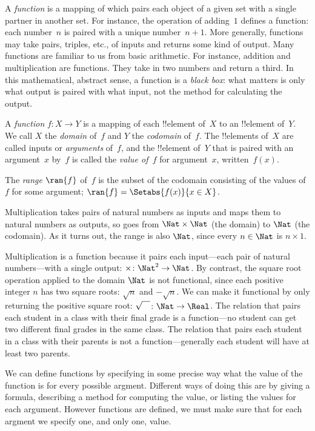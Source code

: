\documentclass[../../../include/open-logic-section]{subfiles}
\begin{document}

\begin{explain}
A \emph{function} is a mapping of which pairs each object of a given
set with a single partner in another set. For instance, the operation
of adding~$1$ defines a function: each number~$n$ is paired with a
unique number~$n+1$. More generally, functions may take pairs,
triples, etc., of inputs and returns some kind of output. Many
functions are familiar to us from basic arithmetic. For instance,
addition and multiplication are functions. They take in two numbers
and return a third.  In this mathematical, abstract sense, a function
is a \emph{black box}: what matters is only what output is paired with
what input, not the method for calculating the output.
\end{explain}

\begin{defn}[Function]
A \emph{function} $f \colon X \to Y$ is a mapping of each !!{element}
of~$X$ to an !!{element} of~$Y$. We call $X$ the \emph{domain} of~$f$
and $Y$ the \emph{codomain} of~$f$.  The !!{element}s of~$X$ are
called inputs or \emph{arguments} of~$f$, and the !!{element} of~$Y$
that is paired with an argument~$x$ by~$f$ is called the \emph{value
  of~$f$} for argument~$x$, written~$f(x)$.

The \emph{range} $\ran{f}$ of~$f$ is the subset of the codomain
consisting of the values of~$f$ for some argument; $\ran{f} =
\Setabs{f(x)}{x \in X}$.
\end{defn}

\begin{ex}
Multiplication takes pairs of natural numbers as inputs and maps them
to natural numbers as outputs, so goes from $\Nat \times \Nat$ (the
domain) to $\Nat$ (the codomain). As it turns out, the range is also
$\Nat$, since every $n \in \Nat$ is $n \times 1$.
\end{ex}

\begin{explain}
Multiplication is a function because it pairs each input---each pair
of natural numbers---with a single output: $\times \colon \Nat^2 \to
\Nat$. By contrast, the square root operation applied to the domain
$\Nat$ is not functional, since each positive integer $n$ has two
square roots: $\sqrt{n}$ and $-\sqrt{n}$. We can make it functional by
only returning the positive square root: $\sqrt{\phantom{X}} \colon
\Nat \to \Real$. The relation that pairs each student in a class with
their final grade is a function---no student can get two different
final grades in the same class. The relation that pairs each student
in a class with their parents is not a function---generally each
student will have at least two parents.

We can define functions by specifying in some precise way what the
value of the function is for every possible argment. Different ways of
doing this are by giving a formula, describing a method for computing
the value, or listing the values for each argument. However functions
are defined, we must make sure that for each argment we specify one,
and only one, value.
\end{explain}
\end{document}
